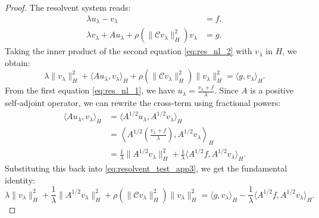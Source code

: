 \documentclass[10pt,a4paper]{amsart}
\begin{document}
\begin{proof}
The resolvent system reads:
\begin{align}
\lambda u_\lambda - v_\lambda &= f, \label{eq:res_nl_1} \\
\lambda v_\lambda + A u_\lambda + \rho(\|\mathcal C v_\lambda\|_H^2) v_\lambda &= g. \label{eq:res_nl_2}
\end{align}
Taking the inner product of the second equation \eqref{eq:res_nl_2} with $v_\lambda$ in $H$, we obtain:
\begin{equation}\label{eq:resolvent_test_app3}
\lambda \|v_\lambda\|_H^2 + \langle A u_\lambda, v_\lambda \rangle_H + \rho(\|\mathcal C v_\lambda\|_H^2) \|v_\lambda\|_H^2 = \langle g, v_\lambda \rangle_H.
\end{equation}
From the first equation \eqref{eq:res_nl_1}, we have $u_\lambda = \frac{v_\lambda + f}{\lambda}$. Since $A$ is a positive self-adjoint operator, we can rewrite the cross-term using fractional powers:
\begin{align*}
\langle A u_\lambda, v_\lambda \rangle_H &= \langle A^{1/2} u_\lambda, A^{1/2} v_\lambda \rangle_H \\
&= \left\langle A^{1/2} \left(\frac{v_\lambda + f}{\lambda}\right), A^{1/2} v_\lambda \right\rangle_H \\
&= \frac{1}{\lambda} \|A^{1/2} v_\lambda\|_H^2 + \frac{1}{\lambda} \langle A^{1/2} f, A^{1/2} v_\lambda \rangle_H.
\end{align*}
Substituting this back into \eqref{eq:resolvent_test_app3}, we get the fundamental identity:
\begin{equation}
\lambda \|v_\lambda\|_H^2 + \frac{1}{\lambda} \|A^{1/2} v_\lambda\|_H^2 + \rho(\|\mathcal C v_\lambda\|_H^2) \|v_\lambda\|_H^2 = \langle g, v_\lambda \rangle_H - \frac{1}{\lambda} \langle A^{1/2} f, A^{1/2} v_\lambda \rangle_H.
\end{equation}


\end{proof}
\end{document}
